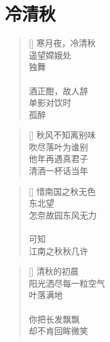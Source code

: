 \chapter{冷清秋}
\thispagestyle{empty}
\renewcommand{\poemtoc}{section}
\settowidth{\versewidth}{寒月夜，冷清秋}
\begin{verse}[\versewidth]
寒月夜，冷清秋\\
遥望嫦娥处\\
独舞\\
~\\
酒正酣，故人辞\\
单影对饮时\\
孤醉
\end{verse}

\renewcommand{\poemtoc}{section}
\settowidth{\versewidth}{秋风不知离别味}
\begin{verse}[\versewidth]
秋风不知离别味\\
吹尽落叶为谁别\\
他年再遇真君子\\
清酒一杯话当年
\end{verse}

\renewcommand{\poemtoc}{section}
\settowidth{\versewidth}{惜南国之秋无色}
\begin{verse}[\versewidth]
惜南国之秋无色\\
东北望\\
怎奈故园东风无力\\
~\\
可知\\
江南之秋秋几许
\end{verse}

\renewcommand{\poemtoc}{section}
\settowidth{\versewidth}{惜南国之秋无色}
\begin{verse}[\versewidth]
清秋的初晨\\
阳光洒尽每一粒空气\\
叶落满地\\
~\\
你把长发飘飘\\
却不肯回眸微笑
\end{verse}
\newpage

